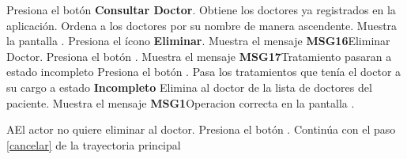  \begin{UCtrayectoria}
 	
 	\UCpaso [\UCactor] Presiona el botón \textbf{Consultar Doctor}.
 	\UCpaso Obtiene los doctores ya registrados en la aplicación.
 	\UCpaso Ordena a los doctores por su nombre de manera ascendente.
 	\UCpaso Muestra la pantalla . \label{cancelar}
 	\UCpaso [\UCactor] Presiona el ícono \textbf{Eliminar}.
 	\UCpaso Muestra el mensaje \textbf{MSG16}{Eliminar Doctor}.
 	\UCpaso [\UCactor] Presiona el botón .
 	\UCpaso Muestra el mensaje \textbf{MSG17}{Tratamiento pasaran a estado incompleto}
 	\UCpaso [\UCactor] Presiona el botón .
 	\UCpaso Pasa los tratamientos que tenía el doctor a su cargo a estado \textbf{Incompleto}
 	\UCpaso Elimina al doctor de la lista de doctores del paciente.
 	\UCpaso Muestra el mensaje \textbf{MSG1}{Operacion correcta} en la pantalla .	
 	
    
 \end{UCtrayectoria}

 \begin{UCtrayectoriaA}{A}{El actor no quiere eliminar al doctor.}
    \UCpaso [\UCactor] Presiona el botón .
    \UCpaso Continúa con el paso \ref{cancelar} de la trayectoria principal
 \end{UCtrayectoriaA}
 



 

 

